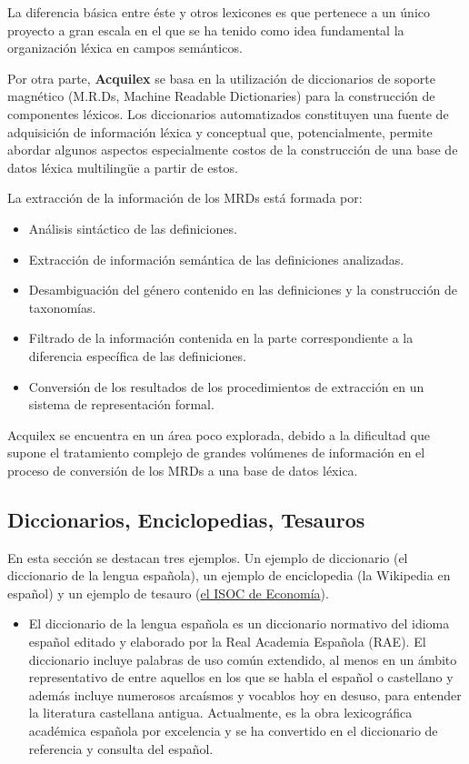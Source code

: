 \documentclass[11pt]{exam}
\begin{document}
\begin{questions}
La diferencia básica entre éste y otros lexicones es que pertenece a un único proyecto a gran escala en el que se ha tenido como idea fundamental la organización léxica en campos semánticos. 

Por otra parte, {\bf Acquilex} se basa en la utilización de diccionarios de soporte magnético (M.R.Ds, Machine Readable Dictionaries) para la construcción de componentes léxicos. Los diccionarios automatizados constituyen una fuente de adquisición de información léxica y conceptual que, potencialmente, permite abordar algunos aspectos especialmente costos de la construcción de una base de datos léxica multilingüe a partir de estos.

La extracción de la información de los MRDs está formada por:

\begin{itemize}
	\item Análisis sintáctico de las definiciones.
	\item Extracción de información semántica de las definiciones analizadas.
	\item Desambiguación del género contenido en las definiciones y la construcción de taxonomías.
	\item Filtrado de la información contenida en la parte correspondiente a la diferencia específica de las definiciones.
	\item Conversión de los resultados de los procedimientos de extracción en un sistema de representación formal.
\end{itemize}

Acquilex se encuentra en un área poco explorada, debido a la dificultad que supone el tratamiento complejo de grandes volúmenes de información en el proceso de conversión de los MRDs a una base de datos léxica.

\subsection*{Diccionarios, Enciclopedias, Tesauros}

En esta sección se destacan tres ejemplos. Un ejemplo de diccionario (el diccionario de la lengua española), un ejemplo de enciclopedia (la Wikipedia en español) y un ejemplo de tesauro (\href{https://digital.csic.es/handle/10261/30257}{el ISOC de Economía}).

\begin{itemize}
	\item El diccionario de la lengua española es un diccionario normativo del idioma español editado y elaborado por la Real Academia Española (RAE). El diccionario incluye palabras de uso común extendido, al menos en un ámbito representativo de entre aquellos en los que se habla el español o castellano y además incluye numerosos arcaísmos y vocablos hoy en desuso, para entender la literatura castellana antigua. Actualmente, es la obra lexicográfica académica española por excelencia y se ha convertido en el diccionario de referencia y consulta del español.
	

\end{itemize}
\end{questions}
\end{document}
